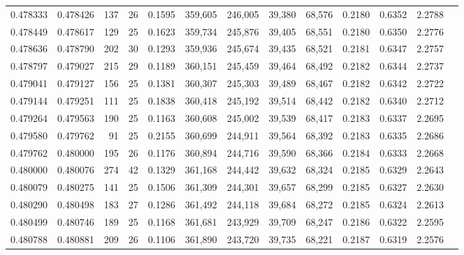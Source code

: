 \begin{tabular}{rrrrrrrrrrrrr}
0.478333 & 0.478426 &    137 &    26 &                                     0.1595 & 359,605 & 246,005 &  39,380 &  68,576 & 0.2180 & 0.6352 & 2.2788 \\
0.478449 & 0.478617 &    129 &    25 &                                     0.1623 & 359,734 & 245,876 &  39,405 &  68,551 & 0.2180 & 0.6350 & 2.2776 \\
0.478636 & 0.478790 &    202 &    30 &                                     0.1293 & 359,936 & 245,674 &  39,435 &  68,521 & 0.2181 & 0.6347 & 2.2757 \\
0.478797 & 0.479027 &    215 &    29 &                                     0.1189 & 360,151 & 245,459 &  39,464 &  68,492 & 0.2182 & 0.6344 & 2.2737 \\
0.479041 & 0.479127 &    156 &    25 &                                     0.1381 & 360,307 & 245,303 &  39,489 &  68,467 & 0.2182 & 0.6342 & 2.2722 \\
0.479144 & 0.479251 &    111 &    25 &                                     0.1838 & 360,418 & 245,192 &  39,514 &  68,442 & 0.2182 & 0.6340 & 2.2712 \\
0.479264 & 0.479563 &    190 &    25 &                                     0.1163 & 360,608 & 245,002 &  39,539 &  68,417 & 0.2183 & 0.6337 & 2.2695 \\
0.479580 & 0.479762 &     91 &    25 &                                     0.2155 & 360,699 & 244,911 &  39,564 &  68,392 & 0.2183 & 0.6335 & 2.2686 \\
0.479762 & 0.480000 &    195 &    26 &                                     0.1176 & 360,894 & 244,716 &  39,590 &  68,366 & 0.2184 & 0.6333 & 2.2668 \\
0.480000 & 0.480076 &    274 &    42 &                                     0.1329 & 361,168 & 244,442 &  39,632 &  68,324 & 0.2185 & 0.6329 & 2.2643 \\
0.480079 & 0.480275 &    141 &    25 &                                     0.1506 & 361,309 & 244,301 &  39,657 &  68,299 & 0.2185 & 0.6327 & 2.2630 \\
0.480290 & 0.480498 &    183 &    27 &                                     0.1286 & 361,492 & 244,118 &  39,684 &  68,272 & 0.2185 & 0.6324 & 2.2613 \\
0.480499 & 0.480746 &    189 &    25 &                                     0.1168 & 361,681 & 243,929 &  39,709 &  68,247 & 0.2186 & 0.6322 & 2.2595 \\
0.480788 & 0.480881 &    209 &    26 &                                     0.1106 & 361,890 & 243,720 &  39,735 &  68,221 & 0.2187 & 0.6319 & 2.2576 \\

\end{tabular}

